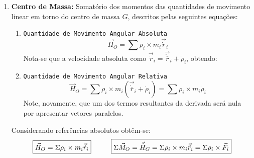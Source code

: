 \documentclass{article}
\begin{document}
\begin{enumerate}[rightmargin = \leftmargin]
                    \item \textbf{Centro de Massa:} Somatório dos momentos das quantidades de movimento linear em torno do centro de massa $G$, descritos pelas seguintes equações:
                        \begin{enumerate}[rightmargin = \leftmargin, noitemsep]
                            \item \texttt{Quantidade de Movimento Angular Absoluta}
                                \begin{equation}
                                    \boxed{
                                        \vec{H}_{O} = \sum \rho_{i}\times m_{i}\vec{\dot{r}}_{i}
                                    }
                                \end{equation}
                            Nota-se que a velocidade absoluta como $\vec{\dot{r}}_{i} = \vec{\dot{\overline{r}}}_{i} + \dot{\rho}_{i}$, obtendo:
                            \item \texttt{Quantidade de Movimento Angular Relativa}
                                \begin{equation}
                                    \boxed{
                                        \vec{H}_{O} = 
                                        \sum \rho_{i}\times m_{i}\left( \vec{\dot{\overline{r}}}_{i} + \dot{\rho}_{i} \right) =
                                        \sum\rho_{i}\times m_{i}\dot{\rho}_{i}
                                    }
                                \end{equation}
                                Note, novamente, que um dos termos resultantes da derivada será nula por apresentar vetores paralelos.
                        \end{enumerate}
                    Considerando referências absolutos obtêm-se:
                        \begin{equation}
                            \boxed{
                                \vec{H}_{O} = \Sigma  \rho_{i}\times m_{i}\vec{\dot{r}}_{i}
                            }
                            \hspace{10mm}
                            \boxed{
                                \Sigma \vec{M}_{O} = 
                                \vec{\dot{H}}_{G} = 
                                \Sigma \rho_{i}\times m_{i}\vec{\ddot{r}}_{i} = 
                                \Sigma \rho_{i}\times\vec{F}_{i}
                            }
                        \end{equation}


\end{enumerate}
\end{document}
